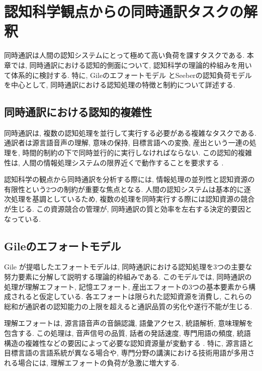 \section{認知科学観点からの同時通訳タスクの解釈}

同時通訳は人間の認知システムにとって極めて高い負荷を課すタスクである.
本章では, 同時通訳における認知的側面について, 認知科学の理論的枠組みを用いて体系的に検討する.
特に, Gileのエフォートモデル \cite{gile1995basic} とSeeberの認知負荷モデル \cite{seeber2011cognitive} を中心として, 同時通訳における認知処理の特徴と制約について詳述する.

\subsection{同時通訳における認知的複雑性}

同時通訳は, 複数の認知処理を並行して実行する必要がある複雑なタスクである.
通訳者は源言語音声の理解, 意味の保持, 目標言語への変換, 産出という一連の処理を, 時間的制約の下で同時並行的に実行しなければならない.
この認知的複雑性は, 人間の情報処理システムの限界近くで動作することを要求する \cite{gile1995basic, christoffels2006cognitive}.

認知科学の観点から同時通訳を分析する際には, 情報処理の並列性と認知資源の有限性という2つの制約が重要な焦点となる.
人間の認知システムは基本的に逐次処理を基調としているため, 複数の処理を同時実行する際には認知資源の競合が生じる.
この資源競合の管理が, 同時通訳の質と効率を左右する決定的要因となっている.

\subsection{Gileのエフォートモデル}

Gile \cite{gile1995basic} が提唱したエフォートモデルは, 同時通訳における認知処理を3つの主要な努力要素に分解して説明する理論的枠組みである.
このモデルでは, 同時通訳の処理が理解エフォート, 記憶エフォート, 産出エフォートの3つの基本要素から構成されると仮定している.
各エフォートは限られた認知資源を消費し, これらの総和が通訳者の認知能力の上限を超えると通訳品質の劣化や遂行不能が生じる.

理解エフォートは, 源言語音声の音韻認識, 語彙アクセス, 統語解析, 意味理解を包含する.
この処理は, 音声信号の品質, 話者の発話速度, 専門用語の頻度, 統語構造の複雑性などの要因によって必要な認知資源量が変動する \cite{gile1995basic}.
特に, 源言語と目標言語の言語系統が異なる場合や, 専門分野の講演における技術用語が多用される場合には, 理解エフォートの負荷が急激に増大する.

